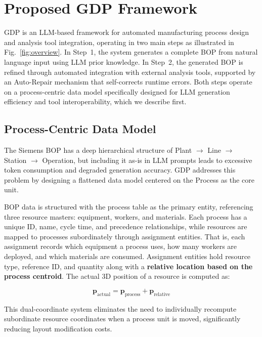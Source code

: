 \documentclass[conference]{IEEEtran}
\begin{document}
\section{Proposed GDP Framework}

GDP is an LLM-based framework for automated manufacturing process design and analysis tool integration, operating in two main steps as illustrated in Fig.~\ref{fig:overview}. In Step~1, the system generates a complete BOP from natural language input using LLM prior knowledge. In Step~2, the generated BOP is refined through automated integration with external analysis tools, supported by an Auto-Repair mechanism that self-corrects runtime errors. Both steps operate on a process-centric data model specifically designed for LLM generation efficiency and tool interoperability, which we describe first.

\subsection{Process-Centric Data Model}

The Siemens BOP has a deep hierarchical structure of Plant $\rightarrow$ Line $\rightarrow$ Station $\rightarrow$ Operation, but including it as-is in LLM prompts leads to excessive token consumption and degraded generation accuracy. GDP addresses this problem by designing a flattened data model centered on the Process as the core unit.

BOP data is structured with the process table as the primary entity, referencing three resource masters: equipment, workers, and materials. Each process has a unique ID, name, cycle time, and precedence relationships, while resources are mapped to processes subordinately through assignment entities. That is, each assignment records which equipment a process uses, how many workers are deployed, and which materials are consumed. Assignment entities hold resource type, reference ID, and quantity along with a \textbf{relative location based on the process centroid}. The actual 3D position of a resource is computed as:

\begin{equation}
\mathbf{p}_{\mathrm{actual}} = \mathbf{p}_{\mathrm{process}} + \mathbf{p}_{\mathrm{relative}}
\label{eq:coord}
\end{equation}

This dual-coordinate system eliminates the need to individually recompute subordinate resource coordinates when a process unit is moved, significantly reducing layout modification costs.
\end{document}
